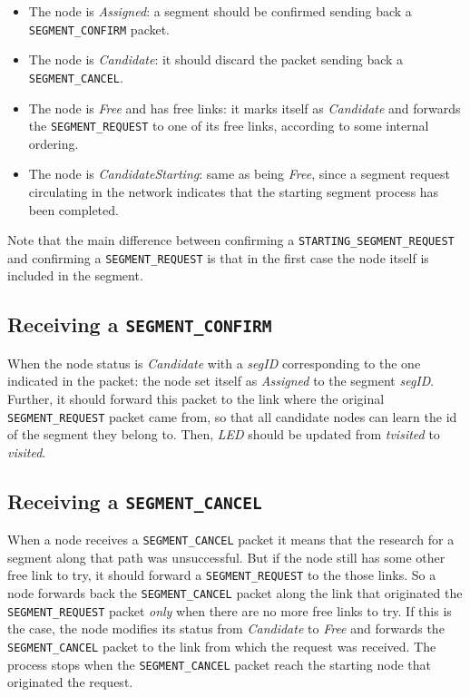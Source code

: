 \begin{itemize}
\item The node is \emph{Assigned}: a segment should be confirmed
sending back a \texttt{SEGMENT\_CONFIRM} packet.
\item The node is \emph{Candidate}: it should discard the packet sending
back a \texttt{SEGMENT\_CANCEL}.
\item The node is \emph{Free} and has free
links: it marks itself as \emph{Candidate} and forwards the \texttt{SEGMENT\_REQUEST}
to one of its free links, according to some internal ordering.
\item The node is \emph{CandidateStarting}: same as being \emph{Free},
since a segment request circulating in the network indicates that the
starting segment process has been completed.
\end{itemize}

Note that the main difference between confirming a \texttt{STARTING\_SEGMENT\_REQUEST}
and confirming a \texttt{SEGMENT\_REQUEST} is that in the first case the node
itself is included in the segment.


\subsection{Receiving a \texttt{SEGMENT\_CONFIRM}}
When the node status is \emph{Candidate} with a \emph{segID} corresponding to the one indicated in
the packet: the node set itself as \emph{Assigned} to the segment \emph{segID}. Further, it should forward this packet to the link where the
original \texttt{SEGMENT\_REQUEST} packet came from, so that all candidate nodes
can learn the id of the segment they belong to. Then, \emph{LED} should be
updated from \emph{tvisited} to \emph{visited}.

\subsection{Receiving a \texttt{SEGMENT\_CANCEL}}
When a node receives a \texttt{SEGMENT\_CANCEL} packet it means that the research
for a segment along that path was unsuccessful. But if the
node still has some other free link to try, it should forward a
\texttt{SEGMENT\_REQUEST} to the those links. So a node forwards back
the \texttt{SEGMENT\_CANCEL} packet along the link that originated the
\texttt{SEGMENT\_REQUEST} packet \emph{only} when there are no more free
links to try. If this is the case, the node modifies its status from
\emph{Candidate} to \emph{Free} and forwards the
\texttt{SEGMENT\_CANCEL} packet to the link from which the request was
received. The process stops when the \texttt{SEGMENT\_CANCEL} packet
reach the starting node that originated the request.

